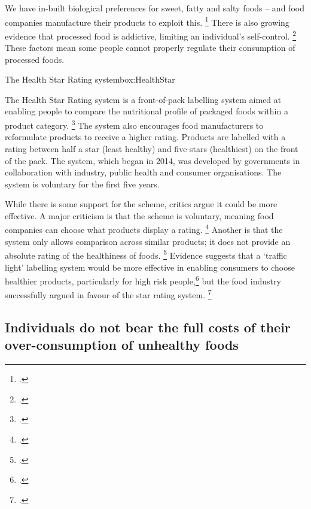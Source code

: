 \documentclass[embargoed]{grattan}
\begin{document}
We have in-built biological preferences for sweet, fatty and salty foods -- and food companies manufacture their products to exploit this.%
\footcites{Moss2013ExtraordinaryScienceAddictive}{Ruhm2012Understandingovereatingobesity} There is also growing evidence that processed food is addictive, limiting an individual's self-control.%
\footcites{Panel2014POLICYBRIEFoptions}{Gearhardt2009PreliminaryvalidationYale}{Ifland2009Refinedfoodaddiction}{Karnani2016ObesityCrisisas}{Lennerz2013Effectsdietaryglycemic}{Schulte2015Currentconsiderationsregarding} These factors mean some people cannot properly regulate their consumption of processed foods.

\begin{smallbox}{The Health Star Rating system}{box:HealthStar}

The Health Star Rating system is a front-of-pack labelling system aimed at enabling people to compare the nutritional profile of packaged foods within a product category.%
\footcite{System2014HealthStarRatings} The system also encourages food manufacturers to reformulate products to receive a higher rating.
Products are labelled with a rating between half a star (least healthy) and five stars (healthiest) on the front of the pack.
The system, which began in 2014, was developed by governments in collaboration with industry, public health and consumer organisations.
The system is voluntary for the first five years.

While there is some support for the scheme, critics argue it could be more effective.
A major criticism is that the scheme is voluntary, meaning food companies can choose what products display a rating.%
\footcite{Clemons2015Howusehealth} Another is that the system only allows comparison across similar products; it does not provide an absolute rating of the healthiness of foods.%
\footcites{Lawrence2015yearonAustralias}{Clemons2015Howusehealth} Evidence suggests that a `traffic light' labelling system would be more effective in enabling consumers to choose healthier products, particularly for high risk people,\footcites{Hawley2013sciencefrontpackage}{Kelly2008Frontpackfood}{Mejean2014Associationperceptionfront}{Turner2014Afterthreeyear} but the food industry successfully argued in favour of the star rating system.%
\footcites{Sacks2011Statesshouldstand}{Gill2011Foodindustrydigs}{Turner2014Afterthreeyear}
\end{smallbox}

\subsection{Individuals do not bear the full costs of their over-consumption of unhealthy foods}\label{individuals-do-not-bear-the-full-costs-of-their-over-consumption-of-unhealthy-foods}
\end{document}
